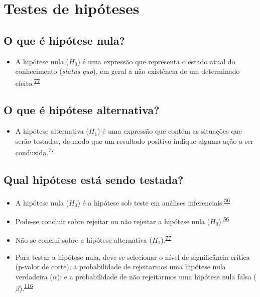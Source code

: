 \documentclass[
  a4paper,
]{book}
\providecommand{\tightlist}{%
  \setlength{\itemsep}{0pt}\setlength{\parskip}{0pt}}
\begin{document}
\hypertarget{erros-inferencia}{%
\section{Testes de hipóteses}\label{erros-inferencia}}

\hypertarget{o-que-uxe9-hipuxf3tese-nula}{%
\subsection{O que é hipótese nula?}\label{o-que-uxe9-hipuxf3tese-nula}}

\begin{itemize}
\tightlist
\item
  A hipótese nula (\(H_{0}\)) é uma expressão que representa o estado atual do conhecimento (\emph{status quo}), em geral a não existência de um determinado efeito.\textsuperscript{\protect\hyperlink{ref-kanji2006}{77}}
\end{itemize}

\hypertarget{o-que-uxe9-hipuxf3tese-alternativa}{%
\subsection{O que é hipótese alternativa?}\label{o-que-uxe9-hipuxf3tese-alternativa}}

\begin{itemize}
\tightlist
\item
  A hipótese alternativa (\(H_{1}\)) é uma expressão que contém as situações que serão testadas, de modo que um resultado positivo indique alguma ação a ser conduzida.\textsuperscript{\protect\hyperlink{ref-kanji2006}{77}}
\end{itemize}

\hypertarget{qual-hipuxf3tese-estuxe1-sendo-testada}{%
\subsection{Qual hipótese está sendo testada?}\label{qual-hipuxf3tese-estuxe1-sendo-testada}}

\begin{itemize}
\item
  A hipótese nula (\(H_{0}\)) é a hipótese sob teste em análises inferenciais.\textsuperscript{\protect\hyperlink{ref-Ali2016}{56}}
\item
  Pode-se concluir sobre rejeitar ou não rejeitar a hipótese nula (\(H_{0}\)).\textsuperscript{\protect\hyperlink{ref-Ali2016}{56}}
\item
  Não se conclui sobre a hipótese alternativa (\(H_{1}\)).\textsuperscript{\protect\hyperlink{ref-kanji2006}{77}}
\item
  Para testar a hipótese nula, deve-se selecionar o nível de significância crítica (p-valor de corte); a probabilidade de rejeitarmos uma hipótese nula verdadeira (\(\alpha\)); e a probabilidade de não rejeitarmos uma hipótese nula falsa (\(\beta\)).\textsuperscript{\protect\hyperlink{ref-Curran-Everett2009}{116}}
\end{itemize}
\end{document}

